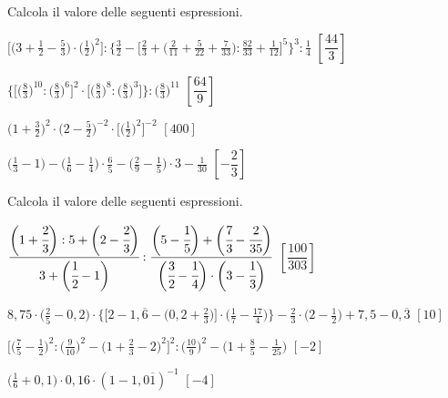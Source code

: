 \begin{esercizio}[\Ast]
\label{ese:3.151}
 Calcola il valore delle seguenti espressioni.
\begin{enumeratea}
\spazielenx
\item \(\displaystyle{\bigg[\bigg(3+\frac{1}{2}-\frac{5}{3}\bigg)\cdot
\bigg(\frac{1}{2}\bigg)^{2}\bigg]:\bigg\{\frac{3}{2}-\bigg[\frac{2}{3}+
\bigg(\frac{2}{11}+
\frac{5}{22}+\frac{7}{33}\bigg):\frac{82}{33}+\frac{1}{12}\bigg]^{5}
\bigg\}^{3}:\frac{1}{4}}\)
  \hfill \(\left[\dfrac{44}{3} \right]\)
\item \(\displaystyle{\bigg\{\bigg[\bigg(\frac{8}{3}\bigg)^{10}:
\bigg(\frac{8}{3}\bigg)^{6}\bigg]^{2}\cdot
\bigg[\bigg(\frac{8}{3}\bigg)^{8}:\bigg(\frac{8}{3}\bigg)^{3}\bigg]\bigg\}:
\bigg(\frac{8}{3}\bigg)^{11}}\)
  \hfill \(\left[\dfrac{64}{9} \right]\)
\item \(\displaystyle{\bigg(1+\frac{3}{2}\bigg)^{2}\cdot
\bigg(2-\frac{5}{2}\bigg)^{-2}\cdot
\bigg[\bigg(\frac{1}{2}\bigg)^{2}\bigg]^{-2}}\)
  \hfill \(\left[400 \right]\)
\item \(\displaystyle{\bigg(\frac{1}{3}-1\bigg)-\bigg(\frac{1}{6}-
\frac{1}{4}\bigg)\cdot
{\frac{6}{5}}-\bigg(\frac{2}{9}-\frac{1}{5}\bigg)\cdot 3-\frac{1}{30}}\)
  \hfill \(\left[-\dfrac{2}{3} \right]\)
\end{enumeratea}
\end{esercizio}

\begin{esercizio}[\Ast]
\label{ese:3.152}
 Calcola il valore delle seguenti espressioni.
\begin{enumeratea}
\spazielenx
\item \(\displaystyle{\cfrac{\bigg(1+\cfrac{2}{3}\bigg):5+\bigg(2-
\cfrac{2}{3}\bigg)}{3+\bigg(\cfrac{1}{2}-1\bigg)}:
\frac{\bigg(5-\cfrac{1}{5}\bigg)+\bigg(\cfrac{7}{3}-\cfrac{2}{35}\bigg)}
{\bigg(\cfrac{3}{2}-\cfrac{1}{4}\bigg)\cdot
\bigg(3-\cfrac{1}{3}\bigg)}}\)
  \hfill \(\left[\dfrac{100}{303} \right]\)
\item \(\displaystyle{8,75\cdot\bigg(\frac{2}{5}-0,2\bigg)\cdot
\bigg\{\bigg[2-1,\overline{6}-\bigg(0,2+\frac{2}{3}\bigg)\bigg]
\cdot\bigg(\frac{1}{7}-\frac{17}{4}\bigg)\bigg\}-\frac{2}{3}\cdot
\bigg(2-\frac{1}{2}\bigg)+7,5-0,\overline{3}}\)
  \hfill \(\left[10 \right]\)
\item \(\displaystyle{\bigg[\bigg(\frac{7}{5}-\frac{1}{2}\bigg)^{2}:
\bigg(\frac{9}{10}\bigg)^{2}-
\bigg(1+\frac{2}{3}-2\bigg)^{2}\bigg]^{2}:\bigg(\frac{10}{9}\bigg)^{2}-
\bigg(1+\frac{8}{5}-\frac{1}{25}\bigg)}\)
  \hfill \(\left[-2 \right]\)
\item \(\displaystyle{\bigg(\frac{1}{6}+0,1\bigg)\cdot 0,16\cdot
(1-1,0\overline{1})^{-1}}\)
  \hfill \(\left[-4 \right]\)
\end{enumeratea}
\end{esercizio}

